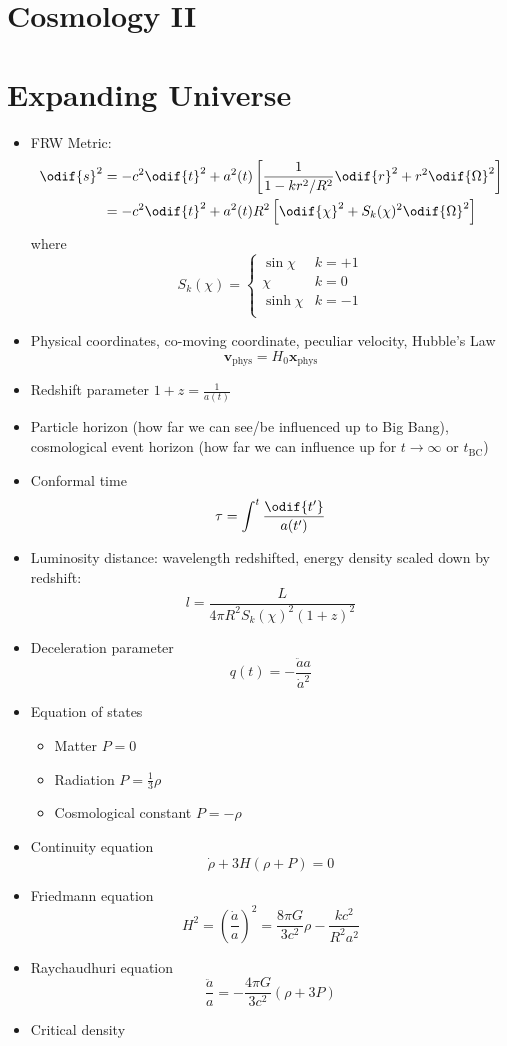 


\section*{Cosmology \hfill II}

\section{Expanding Universe}
\begin{itemize}
\item FRW Metric:
\begin{align*}
    \odif{s}^2 &= -c^2 \odif{t}^2 + a^2(t) \left[\frac{1}{1-kr^2/R^2}\odif{r}^2 + r^2 \odif{\Omega}^2\right] \\
    &= -c^2 \odif{t}^2 + a^2(t) R^2 \left[\odif{\chi}^2 + S_k(\chi)^2 \odif{\Omega}^2\right]
\end{align*}
where \[S_k(\chi) = \begin{cases}
    \sin\chi & k = +1\\
    \chi & k = 0\\
    \sinh\chi & k = -1\\
\end{cases}\]
\item Physical coordinates, co-moving coordinate, peculiar velocity, Hubble's Law \[\mathbf{v}_{\text{phys}} = H_0 \mathbf{x}_{\text{phys}}\]
\item Redshift parameter $1+z=\frac{1}{a(t)}$
\item Particle horizon (how far we can see/be influenced up to Big Bang), cosmological event horizon (how far we can influence up for $t\to\infty$ or $t_\text{BC}$)
\item Conformal time \[\tau = \int^t \frac{\odif{t'}}{a(t')}\]
\item Luminosity distance: wavelength redshifted, energy density scaled down by redshift: \[l = \frac{L}{4\pi R^2 S_k(\chi)^2 (1+z)^2}\]
\item Deceleration parameter \[q(t) = -\frac{\ddot{a}a}{\dot{a}^2}\]
\item Equation of states
\begin{itemize}
    \item Matter $P=0$
    \item Radiation $P=\frac{1}{3}\rho$
    \item Cosmological constant $P=-\rho$
\end{itemize}
\item Continuity equation \[\dot{\rho}+3H(\rho+P)=0\]
\item Friedmann equation \[H^2 = \left(\frac{\dot{a}}{a}\right)^2 = \frac{8\pi G}{3c^2}\rho - \frac{kc^2}{R^2a^2}\]
\item Raychaudhuri equation \[\frac{\ddot{a}}{a} = -\frac{4\pi G}{3c^2} (\rho + 3P)\]
\item Critical density
\end{itemize}

